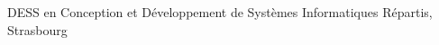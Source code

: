 %
%
%


\begin{scholarship}
					{DESS en Conception et Développement de Systèmes Informatiques Répartis, Strasbourg}
\end{scholarship}


